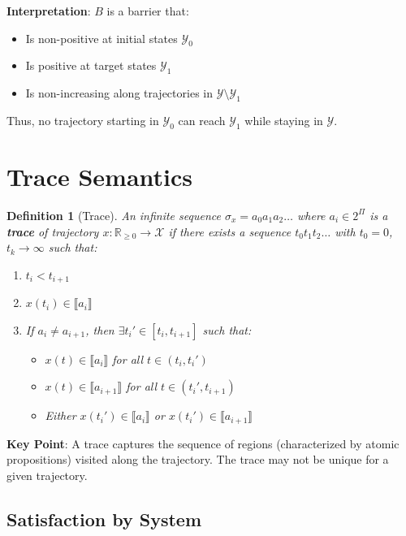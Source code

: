 \documentclass{article}
\newtheorem{definition}{Definition}
\begin{document}
\textbf{Interpretation}: $B$ is a barrier that:
\begin{itemize}
    \item Is non-positive at initial states $\mathcal{Y}_0$
    \item Is positive at target states $\mathcal{Y}_1$
    \item Is non-increasing along trajectories in $\mathcal{Y} \setminus \mathcal{Y}_1$
\end{itemize}
Thus, no trajectory starting in $\mathcal{Y}_0$ can reach $\mathcal{Y}_1$ while staying in $\mathcal{Y}$.

\section{Trace Semantics}

\begin{definition}[Trace]
An infinite sequence $\sigma_x = a_0 a_1 a_2 \ldots$ where $a_i \in 2^\Pi$ is a \textbf{trace} of trajectory $x: \mathbb{R}_{\geq 0} \to \mathcal{X}$ if there exists a sequence $t_0 t_1 t_2 \ldots$ with $t_0 = 0$, $t_k \to \infty$ such that:
\begin{enumerate}
    \item $t_i < t_{i+1}$
    \item $x(t_i) \in \llbracket a_i \rrbracket$
    \item If $a_i \neq a_{i+1}$, then $\exists t_i' \in [t_i, t_{i+1}]$ such that:
    \begin{itemize}
        \item $x(t) \in \llbracket a_i \rrbracket$ for all $t \in (t_i, t_i')$
        \item $x(t) \in \llbracket a_{i+1} \rrbracket$ for all $t \in (t_i', t_{i+1})$
        \item Either $x(t_i') \in \llbracket a_i \rrbracket$ or $x(t_i') \in \llbracket a_{i+1} \rrbracket$
    \end{itemize}
\end{enumerate}
\end{definition}

\textbf{Key Point}: A trace captures the sequence of regions (characterized by atomic propositions) visited along the trajectory. The trace may not be unique for a given trajectory.

\subsection{Satisfaction by System}
\end{document}

